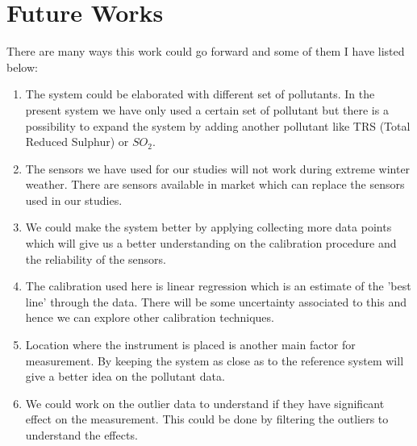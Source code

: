 \section{Future Works}

There are many ways this work could go forward and some of them I have listed below:
\begin{enumerate}
    \item The system could be elaborated with different set of pollutants. In the present system we have only used a certain set of pollutant but there is a possibility to expand the system by adding another pollutant like TRS (Total Reduced Sulphur) or $SO_{2}$.
    
    
    \item The sensors we have used for our studies will not work during extreme winter weather. There are sensors available in market which can replace the sensors used in our studies. 
     
    \item We could make the system better by applying collecting more data points which will give us a better understanding on the calibration procedure and the reliability of the sensors.
    
    \item The calibration used here is linear regression which is an estimate of the 'best line' through the data. There will be some uncertainty associated to this and hence we can explore other calibration techniques.
    
    \item Location where the instrument is placed is another main factor for measurement. By keeping the system as close as to the reference system will give a better idea on the pollutant data.
    
    \item We could work on the outlier data to understand if they have significant effect on the measurement. This could be done by filtering the outliers to understand the effects. 
    

\end{enumerate}



